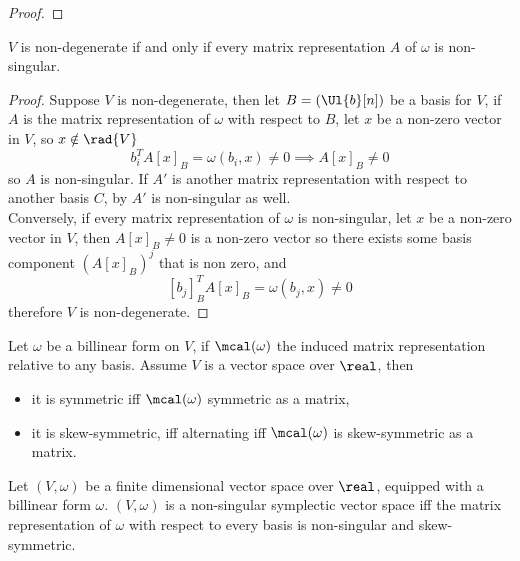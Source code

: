 \documentclass[../main-v2-manifolds.tex]{subfiles}
\begin{document}
    \begin{proof}
        
    \end{proof}
    \begin{wts}
        $V$ is non-degenerate if and only if every matrix representation $A$ of $\omega$ is non-singular. 
    \end{wts}
    \begin{proof}
        Suppose $V$ is non-degenerate, then let $B = (\Ul{b}[n])$ be a basis for $V$, if $A$ is the matrix representation of $\omega$ with respect to $B$, let $x$ be a non-zero vector in $V$, so $x\notin \rad{V}$
        \[
            b_i^T A [x]_B = \omega(b_i, x)\neq 0\implies A[x]_B\neq 0
        \]
        so $A$ is non-singular. If $A'$ is another matrix representation with respect to another basis $C$, by  $A'$ is non-singular as well.\\

        Conversely, if every matrix representation of $\omega$ is non-singular, let $x$ be a non-zero vector in $V$, then $A[x]_B\neq 0$ is a non-zero vector so there exists some basis component  $(A[x]_B)^j$ that is non zero, and
        \[
            [b_j]_B^TA[x]_B = \omega(b_j,x)\neq 0
        \]
        therefore $V$ is non-degenerate.
    \end{proof}
    \begin{wts}
        Let $\omega$ be a billinear form on $V$, if $\mcal(\omega)$ the induced matrix representation relative to any basis. Assume $V$ is a vector space over $\real$, then
        \begin{itemize}
            \item it is symmetric iff $\mcal(\omega)$ symmetric as a matrix,
            \item it is skew-symmetric, iff alternating iff $\mcal(\omega)$ is skew-symmetric as a matrix.
        \end{itemize}
    \end{wts}
    
    \begin{corollary}\label{non-singular-symplectic-form-matrix}
        Let $(V,\omega)$ be a finite dimensional vector space over $\real$, equipped with a billinear form $\omega$. $(V,\omega)$ is a non-singular symplectic vector space iff the matrix representation of $\omega$ with respect to every basis is non-singular and skew-symmetric.
    \end{corollary}
    
\end{document}
